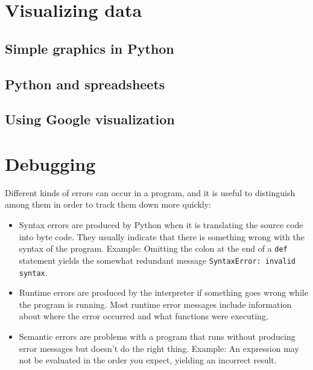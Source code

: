 \documentclass[10pt]{book}
\begin{document}
\chapter{Visualizing data}

\section{Simple graphics in Python}

\section{Python and spreadsheets}

\section{Using Google visualization}




\appendix

\chapter{Debugging}

Different kinds of errors can occur
in a program, and it is useful to distinguish among them
in order to track them down more quickly:

\begin{itemize}

\item Syntax errors are produced by Python when it is translating the
  source code into byte code.  They usually indicate that there is
  something wrong with the syntax of the program.  Example: Omitting
  the colon at the end of a {\tt def} statement yields the somewhat
  redundant message {\tt SyntaxError: invalid syntax}.

\item Runtime errors are produced by the interpreter if something goes
  wrong while the program is running.  Most runtime error messages
  include information about where the error occurred and what
  functions were executing.  

\item Semantic errors are problems with a program that runs without
  producing error messages but doesn't do the right thing.  Example:
  An expression may not be evaluated in the order you expect, yielding
  an incorrect result.

\end{itemize}
\end{document}
